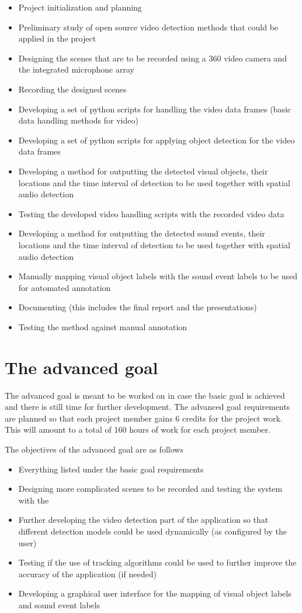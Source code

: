 \begin{itemize}
	\item Project initialization and planning
	\item Preliminary study of open source video detection methods that could be applied in the project
	\item Designing the scenes that are to be recorded using a 360 video camera and the integrated microphone array
	\item Recording the designed scenes
	\item Developing a set of python scripts for handling the video data frames (basic data handling methods for video)
	\item Developing a set of python scripts for applying object detection for the video data frames
	\item Developing a method for outputting the detected visual objects, their locations and the time interval of detection to be used together with spatial audio detection
	\item Testing the developed video handling scripts with the recorded video data
	\item Developing a method for outputting the detected sound events, their locations and the time interval of detection to be used together with spatial audio detection
	\item Manually mapping visual object labels with the sound event labels to be used for automated annotation
	\item Documenting (this includes the final report and the presentations)
	\item Testing the method against manual annotation
\end{itemize} 

\section{The advanced goal}

The advanced goal is meant to be worked on in case the basic goal is achieved and there is still time for further development. The advanced goal requirements are planned so that each project member gains 6 credits for the project work. This will amount to a total of 160 hours of work for each project member. 

The objectives of the advanced goal are as follows

\begin{itemize}
	\item Everything listed under the basic goal requirements
	\item Designing more complicated scenes to be recorded and testing the system with the
	\item Further developing the video detection part of the application so that different detection models could be used dynamically (as configured by the user)
	\item Testing if the use of tracking algorithms could be used to further improve the accuracy of the application (if needed)
	\item Developing a graphical user interface for the mapping of visual object labels and sound event labels
\end{itemize} 

